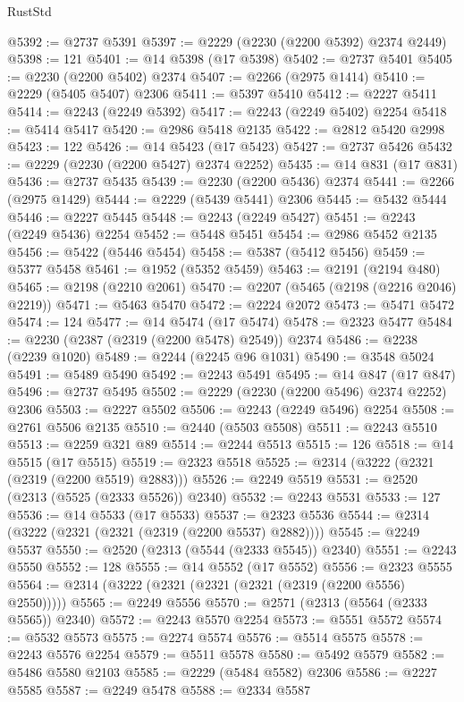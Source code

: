 \begin{lexlean}{RustStd}
\begin{coremodule}
{\begin{coremodule}
{{{{{{{{{{{{{{{{{{{{{{{{{{{{{{{{{{@5392 := @2737 @5391
@5397 := @2229 (@2230 (@2200 @5392) @2374 @2449)
@5398 := 121
@5401 := @14 @5398 (@17 @5398)
@5402 := @2737 @5401
@5405 := @2230 (@2200 @5402) @2374
@5407 := @2266 (@2975 @1414)
@5410 := @2229 (@5405 @5407) @2306
@5411 := @5397 @5410
@5412 := @2227 @5411
@5414 := @2243 (@2249 @5392)
@5417 := @2243 (@2249 @5402) @2254
@5418 := @5414 @5417
@5420 := @2986 @5418 @2135
@5422 := @2812 @5420 @2998
@5423 := 122
@5426 := @14 @5423 (@17 @5423)
@5427 := @2737 @5426
@5432 := @2229 (@2230 (@2200 @5427) @2374 @2252)
@5435 := @14 @831 (@17 @831)
@5436 := @2737 @5435
@5439 := @2230 (@2200 @5436) @2374
@5441 := @2266 (@2975 @1429)
@5444 := @2229 (@5439 @5441) @2306
@5445 := @5432 @5444
@5446 := @2227 @5445
@5448 := @2243 (@2249 @5427)
@5451 := @2243 (@2249 @5436) @2254
@5452 := @5448 @5451
@5454 := @2986 @5452 @2135
@5456 := @5422 (@5446 @5454)
@5458 := @5387 (@5412 @5456)
@5459 := @5377 @5458
@5461 := @1952 (@5352 @5459)
@5463 := @2191 (@2194 @480)
@5465 := @2198 (@2210 @2061)
@5470 := @2207 (@5465 (@2198 (@2216 @2046) @2219))
@5471 := @5463 @5470
@5472 := @2224 @2072
@5473 := @5471 @5472
@5474 := 124
@5477 := @14 @5474 (@17 @5474)
@5478 := @2323 @5477
@5484 := @2230 (@2387 (@2319 (@2200 @5478) @2549)) @2374
@5486 := @2238 (@2239 @1020)
@5489 := @2244 (@2245 @96 @1031)
@5490 := @3548 @5024
@5491 := @5489 @5490
@5492 := @2243 @5491
@5495 := @14 @847 (@17 @847)
@5496 := @2737 @5495
@5502 := @2229 (@2230 (@2200 @5496) @2374 @2252) @2306
@5503 := @2227 @5502
@5506 := @2243 (@2249 @5496) @2254
@5508 := @2761 @5506 @2135
@5510 := @2440 (@5503 @5508)
@5511 := @2243 @5510
@5513 := @2259 @321 @89
@5514 := @2244 @5513
@5515 := 126
@5518 := @14 @5515 (@17 @5515)
@5519 := @2323 @5518
@5525 := @2314 (@3222 (@2321 (@2319 (@2200 @5519) @2883)))
@5526 := @2249 @5519
@5531 := @2520 (@2313 (@5525 (@2333 @5526)) @2340)
@5532 := @2243 @5531
@5533 := 127
@5536 := @14 @5533 (@17 @5533)
@5537 := @2323 @5536
@5544 := @2314 (@3222 (@2321 (@2321 (@2319 (@2200 @5537) @2882))))
@5545 := @2249 @5537
@5550 := @2520 (@2313 (@5544 (@2333 @5545)) @2340)
@5551 := @2243 @5550
@5552 := 128
@5555 := @14 @5552 (@17 @5552)
@5556 := @2323 @5555
@5564 := @2314 (@3222 (@2321 (@2321 (@2321 (@2319 (@2200 @5556) @2550)))))
@5565 := @2249 @5556
@5570 := @2571 (@2313 (@5564 (@2333 @5565)) @2340)
@5572 := @2243 @5570 @2254
@5573 := @5551 @5572
@5574 := @5532 @5573
@5575 := @2274 @5574
@5576 := @5514 @5575
@5578 := @2243 @5576 @2254
@5579 := @5511 @5578
@5580 := @5492 @5579
@5582 := @5486 @5580 @2103
@5585 := @2229 (@5484 @5582) @2306
@5586 := @2227 @5585
@5587 := @2249 @5478
@5588 := @2334 @5587
}}}}}}}}}}}}}}}}}}}}}}}}}}}}}}}}}}
\end{coremodule}}
\end{coremodule}
\end{lexlean}

